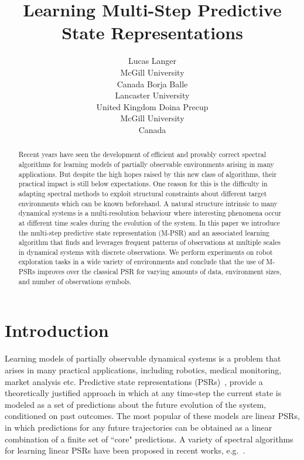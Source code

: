 \documentclass[letterpaper]{article}
\title{Learning Multi-Step Predictive State Representations}
\author{Lucas Langer \\ 
McGill University \\
Canada
\And
Borja Balle \\
Lancaster University \\
United Kingdom
\And
Doina Precup \\
McGill University \\
Canada}
\begin{document}
\maketitle

\begin{abstract}
Recent years have seen the development of efficient and provably correct spectral algorithms for learning models of partially observable environments arising in many applications. But despite the high hopes raised by this new class of algorithms, their practical impact is still below expectations. One reason for this is the difficulty in adapting spectral methods to exploit structural constraints about different target environments which can be known beforehand. A natural structure intrinsic to many dynamical systems is a multi-resolution behaviour where interesting phenomena occur at different time scales during the evolution of the system. In this paper we introduce the multi-step predictive state representation (M-PSR) and an associated learning algorithm that finds and leverages frequent patterns of observations at multiple scales in dynamical systems with discrete observations. We perform experiments on robot exploration tasks in a wide variety of environments and conclude that the use of M-PSRs improves over the classical PSR for varying amounts of data, environment sizes, and number of observations symbols.
\end{abstract}

\section{Introduction}

Learning models of partially observable dynamical systems is a problem that arises in many practical applications, including robotics, medical monitoring, market analysis etc.  Predictive state representations (PSRs)~\cite{littmanpsr,singh04,rosencrantz04}, provide a theoretically justified approach in which at any time-step the current state is modeled as a set of predictions about the future evolution of the system, conditioned on past outcomes.  The most popular of these models are linear PSRs, in which predictions for any future trajectories can be obtained as a linear combination of a finite set of ``core" predictions. A variety of spectral algorithms for learning linear PSRs have been proposed in recent works, e.g.~\cite{bootspsr,Hamilton2013}.
\end{document}
